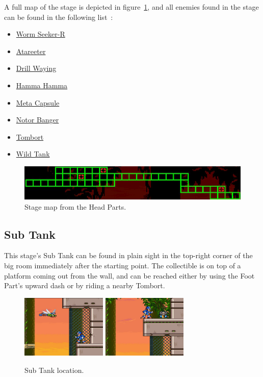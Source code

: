 A full map of the stage is depicted in figure~\ref{fig:Safari_map}, and all enemies found in the stage can be found in the following list~\cite{wiki:safari}:

\begin{itemize}
	\item \hyperlink{miniboss:Worm_seeker-r}{Worm Seeker-R}
	\item \hyperlink{enem:Atareeter}{Atareeter}
	\item \hyperlink{enem:Drill_Waying}{Drill Waying}
	\item \hyperlink{enem:Hamma_Hamma}{Hamma Hamma}
	\item \hyperlink{enem:Meta_Capsule}{Meta Capsule}
	\item \hyperlink{enem:Notor_Banger}{Notor Banger}
	\item \hyperlink{enem:Tombort}{Tombort}
	\item \hyperlink{enem:Wild_Tank}{Wild Tank}
\end{itemize}

\begin{figure}[htp]
	\centering
	\includegraphics[width=.7\linewidth]{figures/X3/Neon_tiger/map.jpg}
	\caption{Stage map from the Head Parts.}
	\label{fig:Safari_map}
\end{figure}

\subsection{Sub Tank}
This stage's Sub Tank can be found in plain sight in the top-right corner of the big room immediately after the starting point. The collectible is on top of a platform coming out from the wall, and can be reached either by using the Foot Part's upward dash or by riding a nearby Tombort.
\begin{figure}[htp]
	\centering
	\includegraphics[height=3cm]{figures/X3/Neon_tiger/tank_1.jpg}
	\includegraphics[height=3cm]{figures/X3/Neon_tiger/tank_2.jpg}
	\caption{Sub Tank location.}
\end{figure}

